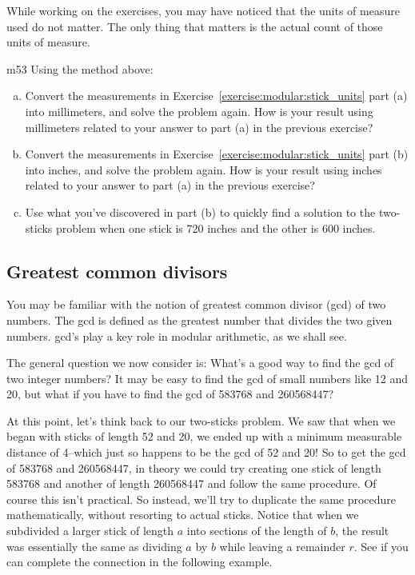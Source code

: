 While working on the exercises, you may have noticed that the units of measure used do not matter.  The only thing that matters is the actual count of those units of measure.  

\begin{exercise}{m53}
Using the method above:
\begin{enumerate}[(a)]
\item
Convert the measurements in Exercise~\ref{exercise:modular:stick_units} part (a) into millimeters, and solve the problem again. How is your result using millimeters related to your answer to part (a) in the previous exercise?
\item
Convert the measurements in Exercise~\ref{exercise:modular:stick_units} part (b) into inches, and solve the problem again. How is your result using inches related to your answer to part (a) in the previous exercise?
\item
Use what you've discovered in part (b) to quickly find a solution to the two-sticks problem when one stick is 720 inches and the other is 600 inches.
\end{enumerate}
\end{exercise}

\subsection{Greatest common divisors}\label{sec:gcd}
You may be  familiar with the notion of greatest common divisor (gcd) of two numbers.  The gcd is defined as the greatest number that divides the two given numbers. gcd's play a key role in modular arithmetic, as we shall see. 

The general question we now consider is: What's a good way to find the gcd of two integer numbers? It may be easy to find the gcd of small numbers like 12 and 20, but what if you have to find the gcd of 583768 and 260568447? 

At this point, let's think back to our two-sticks problem. We saw that when we began with sticks of length 52 and 20, we ended up with a minimum measurable distance of 4--which just so happens to be the gcd of 52 and 20! So to get the gcd of 583768 and 260568447, in theory we could try creating one stick of length 583768 and another of length 260568447 and follow the same procedure. Of course this isn't practical. So instead, we'll try to duplicate the same procedure mathematically, without resorting to actual sticks.  Notice that when we subdivided a larger stick of length $a$ into sections of the length of $b$, the result was essentially the same as dividing $a$ by $b$ while leaving a remainder $r$.  See if you can complete the connection in the following example.

